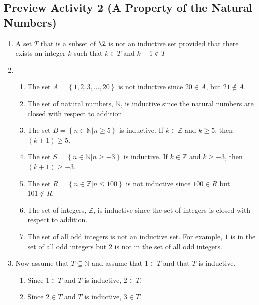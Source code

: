 \hbreak

\subsection*{Preview Activity 2 \textbf{(A Property of the Natural Numbers)}}
\begin{enumerate}
  \item A set $T$ that is a subset of $\Z$ is not an inductive set provided that there exists an integer $k$ such that $k \in T$ and $k+1 \notin T$
\item \begin{enumerate}
\item The set  $A = \left\{ {1, 2, 3,  \ldots , 20} \right\}$  is not inductive since  
$20 \in A$, but $21 \notin A$.

\item The set of natural numbers, $\mathbb{N}$, is inductive since the natural numbers are closed with respect to addition.


\item The set  $B = \left\{ {\left. {n \in \mathbb{N}} \right| n \geq 5} \right\}$
 is inductive.  If  $k \in \mathbb{Z}$ and  $k \geq 5$, then  
$\left( {k + 1} \right) \geq 5$.

\item The set  $S = \left\{ {\left. {n \in \mathbb{N}} \right| n \geq  - 3} \right\}$
 is inductive.  If  $k \in \mathbb{Z}$ and  $k \geq  - 3$, then  
$\left( {k + 1} \right) \geq  - 3$.

\item The set  $R = \left\{ {n \in \mathbb{Z}\left| {n \leq 100} \right.} \right\}$
 is not inductive since $100 \in R$ but $101 \notin R$.

\item The set of integers, $\mathbb{Z}$, is inductive since  the set of integers is closed with respect to addition.
\item The set of all odd integers is not an inductive set.  For example, $1$ is in the set of all odd integers but 2 is not in the set of all odd integers.
\end{enumerate}


\item Now assume that  $T \subseteq \mathbb{N}$ and assume that  $1 \in T$ and that  $T$ is inductive.
\begin{enumerate}
\item Since $1 \in T$ and $T$ is inductive,   $2 \in T$.

\item Since $2 \in T$ and $T$ is inductive,  $3 \in T$.


\end{enumerate}
\end{enumerate}
